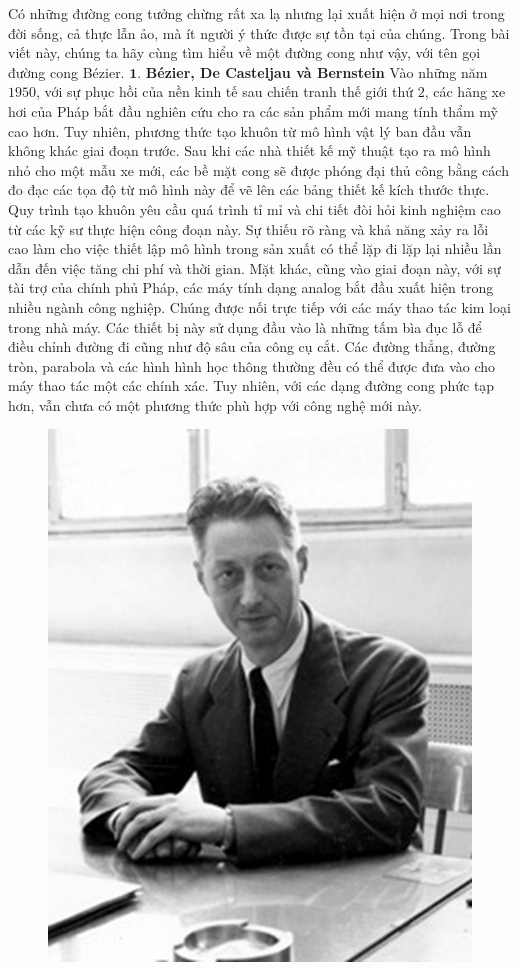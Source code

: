 \begin{multicols}{2}
	Có những đường cong tưởng chừng rất xa lạ nhưng lại xuất hiện ở mọi nơi trong đời sống, cả thực lẫn ảo, mà ít người ý thức được sự tồn tại của chúng. Trong bài viết này, chúng ta hãy cùng tìm hiểu về một đường cong như vậy, với tên gọi đường cong Bézier.
	\vskip 0.1cm
	$\pmb{1.}$ \textbf{\color{toanhocdoisong}Bézier, De Casteljau và Bernstein}
	\vskip 0.1cm
	Vào những năm $1950$, với sự phục hồi của nền kinh tế sau chiến tranh thế giới thứ $2$, các hãng xe hơi của Pháp bắt đầu nghiên cứu cho ra các sản phẩm mới mang tính thẩm mỹ cao hơn. Tuy nhiên, phương thức tạo khuôn từ mô hình vật lý ban đầu vẫn không khác giai đoạn trước. Sau khi các nhà thiết kế mỹ thuật tạo ra mô hình nhỏ cho một mẫu xe mới, các bề mặt cong sẽ được phóng đại thủ công bằng cách đo đạc các tọa độ từ mô hình này để vẽ lên các bảng thiết kế kích thước thực. Quy trình tạo khuôn yêu cầu quá trình tỉ mỉ và chi tiết đòi hỏi kinh nghiệm cao từ các kỹ sư thực hiện công đoạn này. Sự thiếu rõ ràng và khả năng xảy ra lỗi cao làm cho việc thiết lập mô hình trong sản xuất có thể lặp đi lặp lại nhiều lần dẫn đến việc tăng chi phí và thời gian.
	\vskip 0.1cm
	Mặt khác, cũng vào giai đoạn này, với sự tài trợ của chính phủ Pháp, các máy tính dạng analog bắt đầu xuất hiện trong nhiều ngành công nghiệp. Chúng được nối trực tiếp với các máy thao tác kim loại trong nhà máy. Các thiết bị này sử dụng đầu vào là những tấm bìa đục lỗ để điều chỉnh đường đi cũng như độ sâu của công cụ cắt. Các đường thẳng, đường tròn, parabola và các hình hình học thông thường đều có thể được đưa vào cho máy thao tác một các chính xác. Tuy nhiên, với các dạng đường cong phức tạp hơn, vẫn chưa có một phương thức phù hợp với công nghệ mới này.
	\begin{figure}[H]
		\vspace*{-5pt}
		\centering
		\captionsetup{labelformat= empty, justification=centering}
		\includegraphics[width= 0.7\linewidth]{1}

\end{figure}
\end{multicols}
